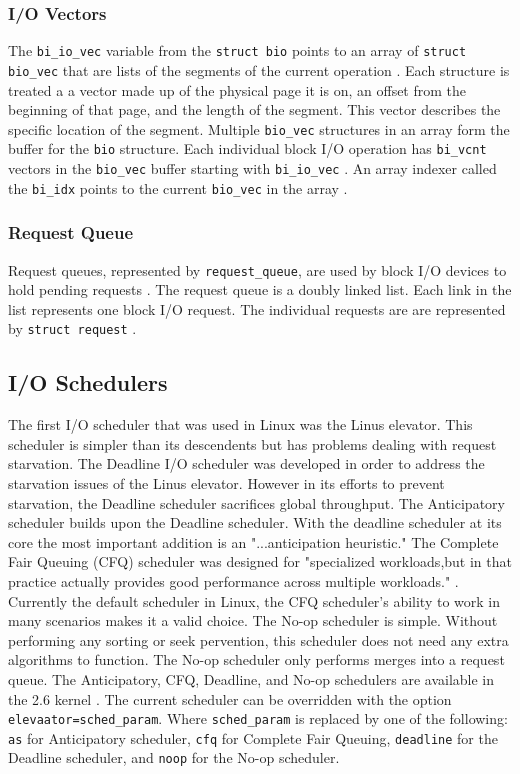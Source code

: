 \subsubsection{I/O Vectors}
The \lstinline{bi_io_vec} variable from the \lstinline{struct bio} points to an array of \lstinline{struct bio_vec} that are lists of the segments of the current operation \cite{LinuxTextbook}. Each structure is treated a a vector made up of the physical page it is on, an offset from the beginning of that page, and the length of the segment. This vector describes the specific location of the segment. Multiple \lstinline{bio_vec} structures in an array form the buffer for the \lstinline{bio} structure.
Each individual block I/O operation has \lstinline{bi_vcnt} vectors in the \lstinline{bio_vec} buffer starting with \lstinline{bi_io_vec} \cite{LinuxTextbook}. An array indexer called the \lstinline{bi_idx} points to the current  \lstinline{bio_vec} in the array \cite{LinuxTextbook}. 


\subsubsection{Request Queue}
Request queues, represented by \lstinline{request_queue}, are used by block I/O devices to hold pending requests \cite{LinuxTextbook}. The request queue is a doubly linked list. Each link in the list represents one block I/O request. The individual requests are are represented by \lstinline{struct request} \cite{LinuxTextbook}.


\subsection{I/O Schedulers}
The first I/O scheduler that was used in Linux was the Linus elevator. This scheduler is simpler than its descendents but has problems dealing with request starvation. The Deadline I/O scheduler was developed in order to address the starvation issues of the Linus elevator. However in its efforts to prevent starvation, the Deadline scheduler sacrifices global throughput. The Anticipatory scheduler builds upon the Deadline scheduler. With the deadline scheduler at its core the most important addition is an "...anticipation heuristic." \cite{LinuxTextbook} The Complete  Fair Queuing (CFQ) scheduler was designed for "specialized workloads,but in that practice actually provides good performance across multiple workloads." \cite{LinuxTextbook}. Currently the default scheduler in Linux, the CFQ scheduler's ability to work in  many scenarios makes it a valid choice. The No-op scheduler is simple. Without performing any sorting or seek pervention, this scheduler does not need any extra algorithms to function. The No-op scheduler only performs merges into a request queue. The Anticipatory, CFQ, Deadline, and No-op schedulers are available in the 2.6 kernel \cite{LinuxTextbook}. The current scheduler can be overridden with the option \lstinline{elevaator=sched_param}. Where \lstinline{sched_param} is replaced by one of the following: \lstinline{as} for Anticipatory scheduler, \lstinline{cfq} for Complete Fair Queuing, \lstinline{deadline} for the Deadline scheduler, and \lstinline{noop} for the No-op scheduler.

